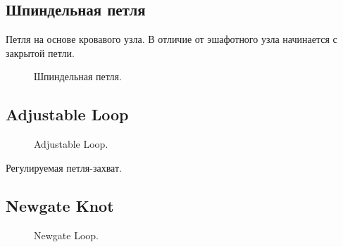 \subsection{Шпиндельная петля}

Петля на основе кровавого узла. В отличие от эшафотного узла начинается с закрытой петли.

\begin{figure}[H]\centering
	\begin{minipage}{1\linewidth}
		\begin{center}
			\tcbox[enhanced jigsaw,colframe=black,opacityframe=0.5,opacityback=0.5]
			{\centering{}}
		\end{center}
	\end{minipage}
\caption{Шпиндельная петля.}
\label{ris:Shpindel_loop}
\end{figure}

\subsection{Adjustable Loop}

\begin{figure}[H]\centering
	\begin{minipage}{1\linewidth}
		\begin{center}
			\tcbox[enhanced jigsaw,colframe=black,opacityframe=0.5,opacityback=0.5]
			{\centering{}}
		\end{center}
	\end{minipage}
\caption{Adjustable Loop.}
\label{ris:Adjustable_Loop}
\end{figure}

Регулируемая петля-захват.

\subsection{Newgate Knot}

\begin{figure}[H]\centering
	\begin{minipage}{1\linewidth}
		\begin{center}
			\tcbox[enhanced jigsaw,colframe=black,opacityframe=0.5,opacityback=0.5]
			{\centering{}}
		\end{center}
	\end{minipage}
\caption{Newgate Loop.}
\label{ris:Newgate_Knot}
\end{figure}

